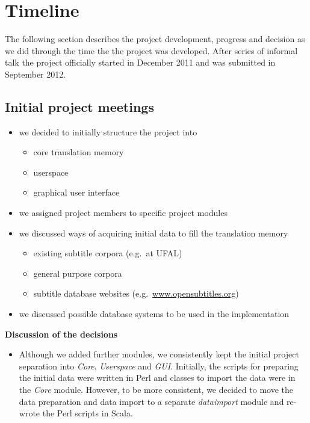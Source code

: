 \section{Timeline}

The following section describes the project development, progress and decision as we did through the time the the project was developed. After series of informal talk the project officially started in December 2011 and was submitted in September 2012.

\subsection{Initial project meetings}

\begin{itemize}
	\item we decided to initially structure the project into
		\begin{itemize}
			\item core translation memory
			\item userspace
			\item graphical user interface
		\end{itemize}
	\item we assigned project members to specific project modules
	\item we discussed ways of acquiring initial data to fill the translation memory
		\begin{itemize}
			\item existing subtitle corpora (e.g.\ at UFAL)
			\item general purpose corpora
			\item subtitle database websites (e.g.\ \url{www.opensubtitles.org})
		\end{itemize}
	\item we discussed possible database systems to be used in the implementation
\end{itemize}


\noindent\textbf{Discussion of the decisions}
\begin{itemize}
	\item Although we added further modules, we consistently kept the initial project separation into \emph{Core}, \emph{Userspace} and \emph{GUI}. Initially, the scripts for preparing the initial data were written in Perl and classes to import the data were in the \emph{Core} module. However, to be more consistent, we decided to move the data preparation and data import to a separate \emph{dataimport} module and re-wrote the Perl scripts in Scala.
\end{itemize}

